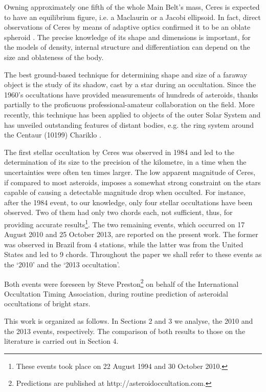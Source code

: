 \documentclass[useAMS,usenatbib]{mn2e}
\begin{document}
Owning approximately one fifth of the whole Main Belt's mass, Ceres is expected to have an equilibrium figure, i.e. a Maclaurin or a Jacobi ellipsoid. In fact, direct observations of Ceres by means of adaptive optics confirmed it to be an oblate spheroid \citep{Drummond2014}. The precise knowledge of its shape and dimensions is important, for the models of density, internal structure and differentiation can depend on the size and oblateness of the body.

The best ground-based technique for determining shape and size of a faraway object is the study of its shadow, cast by a star during an occultation. Since the 1960's occultations have provided measurements of hundreds of asteroids, thanks partially to the proficuous professional-amateur collaboration on the field. More recently, this technique has been applied to objects of the outer Solar System and has unveiled outstanding features of distant bodies, e.g. the ring system around the Centaur (10199) Chariklo \citep{BragaRibas2014}.

The first stellar occultation by Ceres was observed in 1984 \citep{Millis1987} and led to the determination of its size to the precision of the kilometre, in a time when the uncertainties were often ten times larger. The low apparent magnitude of Ceres, if compared to most asteroids, imposes a somewhat strong constraint on the stars capable of causing a detectable magnitude drop when occulted. For instance, after the 1984 event, to our knowledge, only four stellar occultations have been observed. Two of them had only two chords each, not sufficient, thus, for providing accurate results\footnote{These events took place on 22 August 1994 and 30 October 2010.}. The two remaining events, which occurred on 17 August 2010 and 25 October 2013, are reported on the present work. The former was observed in Brazil from 4 stations, while the latter was from the United States and led to 9 chords. Throughout the paper we shall refer to these events as the `2010' and the `2013 occultation'.

Both events were foreseen by Steve Preston\footnote{Predictions are published at http://asteroidoccultation.com.} on behalf of the International Occultation Timing Association, during routine prediction of asteroidal occultations of bright stars.

This work is organized as follows. In Sections 2 and 3 we analyse, the 2010 and the 2013 events, respectively. The comparison of both results to those on the literature is carried out in Section 4.
\end{document}
